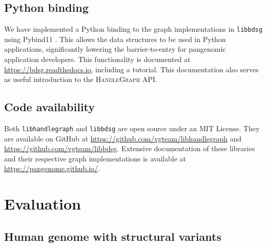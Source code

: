 \documentclass{bioinfo}
\begin{document}
\begin{methods}

\subsection{Python binding}

We have implemented a Python binding to the graph implementations in \texttt{libbdsg} using Pybind11 \citep{pybind11}.
This allows the data structures to be used in Python applications, significantly lowering the barrier-to-entry for pangenomic application developers.
This functionality is documented at \url{https://bdsg.readthedocs.io}, including a tutorial.
This documentation also serves as useful introduction to the \textsc{HandleGraph} API.

\subsection{Code availability}

Both \texttt{libhandlegraph} and \texttt{libbdsg} are open source under an MIT License.
They are available on GitHub at \url{https://github.com/vgteam/libhandlegraph} and \url{https://github.com/vgteam/libbdsg}.
Extensive documentation of these libraries and their respective graph implementations is available at \url{https://pangenome.github.io/}.

\end{methods}



\section{Evaluation}

\subsection{Human genome with structural variants}
\end{document}
